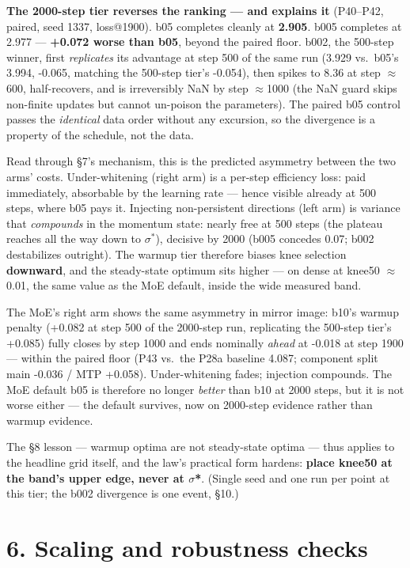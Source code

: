 \documentclass[
]{article}
\begin{document}
\textbf{The 2000-step tier reverses the ranking --- and explains it}
(P40--P42, paired, seed 1337, loss@1900). b05 completes cleanly at
\textbf{2.905}. b005 completes at 2.977 --- \textbf{+0.072 worse than
b05}, beyond the paired floor. b002, the 500-step winner, first
\emph{replicates} its advantage at step 500 of the same run (3.929
vs.~b05's 3.994, -0.065, matching the 500-step tier's -0.054), then
spikes to 8.36 at step \(\approx\){}600, half-recovers, and is
irreversibly NaN by step \(\approx\){}1000 (the NaN guard skips
non-finite updates but cannot un-poison the parameters). The paired b05
control passes the \emph{identical} data order without any excursion, so
the divergence is a property of the schedule, not the data.

Read through §7's mechanism, this is the predicted asymmetry between the
two arms' costs. Under-whitening (right arm) is a per-step efficiency
loss: paid immediately, absorbable by the learning rate --- hence
visible already at 500 steps, where b05 pays it. Injecting
non-persistent directions (left arm) is variance that \emph{compounds}
in the momentum state: nearly free at 500 steps (the plateau reaches all
the way down to \(\sigma^*\)), decisive by 2000 (b005 concedes 0.07;
b002 destabilizes outright). The warmup tier therefore biases knee
selection \textbf{downward}, and the steady-state optimum sits higher
--- on dense at knee50 \(\approx\) 0.01, the same value as the MoE
default, inside the wide measured band.

The MoE's right arm shows the same asymmetry in mirror image: b10's
warmup penalty (+0.082 at step 500 of the 2000-step run, replicating the
500-step tier's +0.085) fully closes by step 1000 and ends nominally
\emph{ahead} at -0.018 at step 1900 --- within the paired floor (P43
vs.~the P28a baseline 4.087; component split main -0.036 / MTP +0.058).
Under-whitening fades; injection compounds. The MoE default b05 is
therefore no longer \emph{better} than b10 at 2000 steps, but it is not
worse either --- the default survives, now on 2000-step evidence rather
than warmup evidence.

The §8 lesson --- warmup optima are not steady-state optima --- thus
applies to the headline grid itself, and the law's practical form
hardens: \textbf{place knee50 at the band's upper edge, never at
\(\sigma\)*}. (Single seed and one run per point at this tier; the b002
divergence is one event, §10.)

\section{6. Scaling and robustness
checks}\label{scaling-and-robustness-checks}
\end{document}
